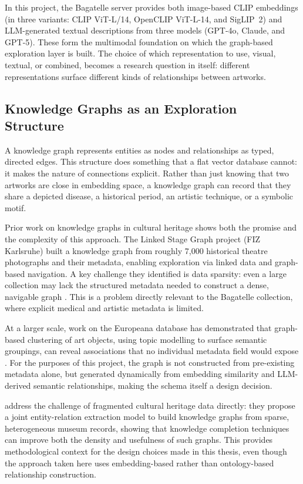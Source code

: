\documentclass[12pt, a4paper]{article}
\begin{document}
In this project, the Bagatelle server provides both image-based CLIP embeddings (in three
variants: CLIP ViT-L/14, OpenCLIP ViT-L-14, and SigLIP~2) and LLM-generated textual
descriptions from three models (GPT-4o, Claude, and GPT-5). These form the multimodal
foundation on which the graph-based exploration layer is built. The choice of which representation
to use, visual, textual, or combined, becomes a research question in itself: different representations
surface different kinds of relationships between artworks.

\subsection{Knowledge Graphs as an Exploration Structure}

A knowledge graph represents entities as nodes and relationships as typed, directed edges. This
structure does something that a flat vector database cannot: it makes the nature of connections
explicit. Rather than just knowing that two artworks are close in embedding space, a knowledge
graph can record that they share a depicted disease, a historical period, an artistic technique, or
a symbolic motif.

Prior work on knowledge graphs in cultural heritage shows both the promise and the complexity
of this approach. The Linked Stage Graph project (FIZ Karlsruhe) built a knowledge graph from
roughly 7,000 historical theatre photographs and their metadata, enabling exploration via linked
data and graph-based navigation. A key challenge they identified is data sparsity: even a large
collection may lack the structured metadata needed to construct a dense, navigable graph
\citep{tietz2020}. This is a problem directly relevant to the Bagatelle collection, where explicit
medical and artistic metadata is limited.

At a larger scale, work on the Europeana database has demonstrated that graph-based clustering
of art objects, using topic modelling to surface semantic groupings, can reveal associations that
no individual metadata field would expose \citep{kouretsis2022}. For the purposes of this project,
the graph is not constructed from pre-existing metadata alone, but generated dynamically from
embedding similarity and LLM-derived semantic relationships, making the schema itself a design
decision.

\citet{huang2023} address the challenge of fragmented cultural heritage data directly: they propose
a joint entity-relation extraction model to build knowledge graphs from sparse, heterogeneous
museum records, showing that knowledge completion techniques can improve both the density
and usefulness of such graphs. This provides methodological context for the design choices made
in this thesis, even though the approach taken here uses embedding-based rather than
ontology-based relationship construction.
\end{document}

